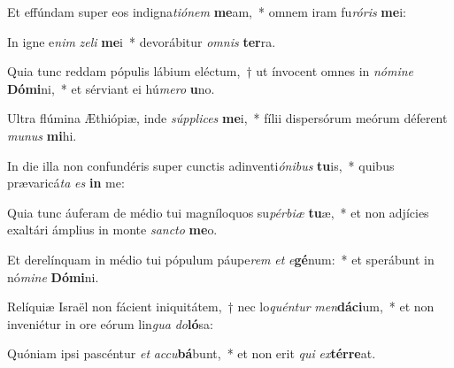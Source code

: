 \item Et effúndam super eos indigna\textit{ti}\textit{ó}\textit{nem} \textbf{me}am,~* omnem iram fu\textit{ró}\textit{ris} \textbf{me}i:
\item In igne e\textit{nim} \textit{ze}\textit{li} \textbf{me}i~* devorábitur \textit{om}\textit{nis} \textbf{ter}ra.
\item Quia tunc reddam pópulis lábium eléctum,~† ut ínvocent omnes in \textit{nó}\textit{mi}\textit{ne} \textbf{Dó}\textbf{mi}ni,~* et sérviant ei hú\textit{me}\textit{ro} \textbf{u}no.
\item Ultra flúmina Æthiópiæ, inde \textit{súp}\textit{pli}\textit{ces} \textbf{me}i,~* fílii dispersórum meórum déferent \textit{mu}\textit{nus} \textbf{mi}hi.
\item In die illa non confundéris super cunctis adinventi\textit{ó}\textit{ni}\textit{bus} \textbf{tu}is,~* quibus prævaricá\textit{ta} \textit{es} \textbf{in} me:
\item Quia tunc áuferam de médio tui magníloquos su\textit{pér}\textit{bi}\textit{æ} \textbf{tu}æ,~* et non adjícies exaltári ámplius in monte \textit{sanc}\textit{to} \textbf{me}o.
\item Et derelínquam in médio tui pópulum páupe\textit{rem} \textit{et} \textit{e}\textbf{gé}num:~* et sperábunt in nó\textit{mi}\textit{ne} \textbf{Dó}\textbf{mi}ni.
\item Relíquiæ Israël non fácient iniquitátem,~† nec lo\textit{quén}\textit{tur} \textit{men}\textbf{dá}\textbf{ci}um,~* et non inveniétur in ore eórum lin\textit{gua} \textit{do}\textbf{ló}sa:
\item Quóniam ipsi pascéntur \textit{et} \textit{ac}\textit{cu}\textbf{bá}bunt,~* et non erit \textit{qui} \textit{ex}\textbf{tér}\textbf{re}at.
